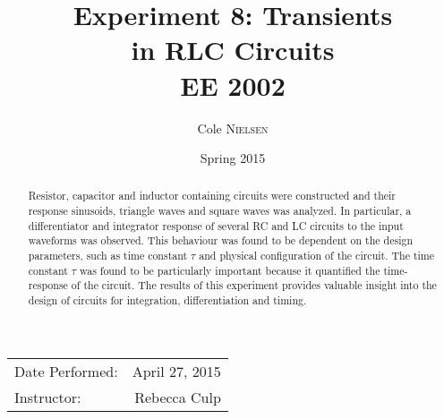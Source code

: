 \documentclass[12pt]{article}
\title{Experiment 8: Transients \\in RLC Circuits \\\vspace{0.3 in} EE 2002}
\author{Cole \textsc{Nielsen}}
\date{Spring 2015}
\begin{document}
\maketitle 
\begin{center}
 \begin{tabular}{l r}
   Date Performed: & April 27, 2015 \\ 
   Instructor: & Rebecca Culp\\ 
\end{tabular}
\end{center}
\pagebreak


\begin{abstract}
\noindent Resistor, capacitor and inductor containing circuits were constructed and their response sinusoids, triangle waves and square waves was analyzed. In particular, a differentiator and integrator response of several RC and LC circuits to the input waveforms was observed. This behaviour was found to be dependent on the design parameters, such as time constant $\tau$ and physical configuration of the circuit. The time constant $\tau$ was found to be particularly important because it quantified the time-response of the circuit. The results of this experiment provides valuable insight into the design of circuits for integration, differentiation and timing.
\end{abstract}
\hrulefill
\end{document}
